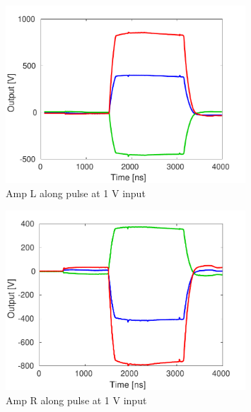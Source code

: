 \begin{figure}
  \centering
  \includegraphics[width=0.8\textwidth]{Figures/commissioning/AmpL_Traces}
  \caption{Amp L along pulse at 1 V input}
  \label{f:ampLTraces}
\end{figure}

\begin{figure}
  \centering
  \includegraphics[width=0.8\textwidth]{Figures/commissioning/AmpR_Traces}
  \caption{Amp R along pulse at 1 V input}
  \label{f:ampRTraces}
\end{figure}

